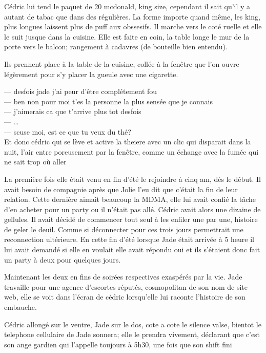 Cédric lui tend le paquet de 20 mcdonald, king size, cependant il sait qu'il y a
autant de tabac que dans des régulières. La forme importe quand même, les king,
plus longues laissent plus de puff aux obssesifs. Il marche vers le coté ruelle et elle
le suit jusque dans la cuisine. Elle est faite en coin, la table longe le
mur de la porte vers le balcon; rangement à cadavres (de bouteille bien
entendu).

Ils prennent place à la table de la cuisine, collée à la fenêtre
que l'on ouvre légèrement pour s'y placer la gueule avec une cigarette.

--- desfois jade j'ai peur d'être complétement fou\\
--- ben non pour moi t'es la personne la plus sensée que je connais\\
--- j'aimerais ca que t'arrive plus tot desfois\\
--- \ldots\\
--- scuse moi, est ce que tu veux du thé?\\

Et donc cédric qui se lève et active la theiere avec un clic qui disparait
dans la nuit, l'air entre poreusement par la fenêtre, comme un échange
avec la fumée qui ne sait trop où aller

La première fois elle était venu en fin d'été le rejoindre à cinq am, dès le
début. Il avait besoin de compagnie après que Jolie l'eu dit que c'était la fin
de leur relation. Cette dernière aimait beaucoup la MDMA, elle lui avait confié
la tâche d'en acheter pour un party ou il n'était pas allé. Cédric avait alors
une dizaine de gellules. Il avait décidé de commencer tout seul à les enfiler
une par une, histoire de geler le deuil. Comme si déconnecter pour ces trois
jours permettrait une reconnection ultérieure. En cette fin d'été lorsque Jade
était arrivée à 5 heure il lui avait demandé si elle en voulait elle avait
répondu oui et ils s'étaient donc fait un party à deux pour quelques jours.


Maintenant les deux en fins de soirées respectives exaspérés par la vie.
Jade travaille pour une agence d'escortes réputés, cosmopolitan de son
nom de site web, elle se voit dans l'écran de cédric lorsqu'elle lui raconte
l'histoire de son embauche.

\clearpage
Cédric allongé sur le ventre, Jade sur le dos, cote a cote le silence valse,
bientot le telephone cellulaire de Jade sonnera; elle le prendra vivement,
déclarant que c'est son ange gardien qui l'appelle toujours à 5h30, une fois que
son shift fini


